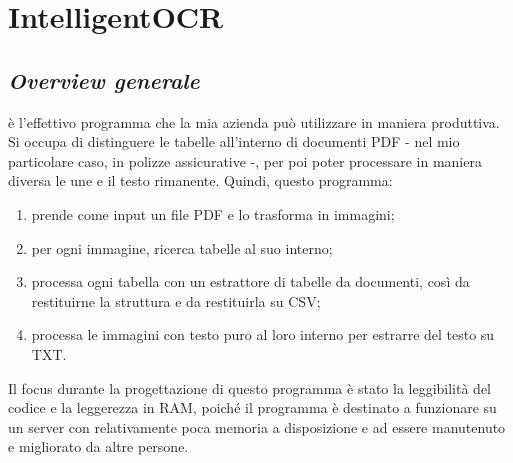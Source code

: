 \newpage
\section{IntelligentOCR}
    \subsection{\textit{Overview generale}}
     è l'effettivo programma che la mia azienda può utilizzare in maniera produttiva. Si occupa di distinguere le tabelle all'interno di documenti PDF - nel mio particolare caso, in polizze assicurative -, per poi poter processare in maniera diversa le une e il testo rimanente. Quindi, questo programma:
    \begin{enumerate}
        \item prende come input un file PDF e lo trasforma in immagini;
        \item per ogni immagine, ricerca tabelle al suo interno;
        \item processa ogni tabella con un estrattore di tabelle da documenti, così da restituirne la struttura e da restituirla su CSV;
        \item processa le immagini con testo puro al loro interno per estrarre del testo su TXT.
    \end{enumerate}
    Il focus durante la progettazione di questo programma è stato la leggibilità del codice e la leggerezza in RAM, poiché il programma è destinato a funzionare su un server con relativamente poca memoria a disposizione e ad essere manutenuto e migliorato da altre persone.
    
